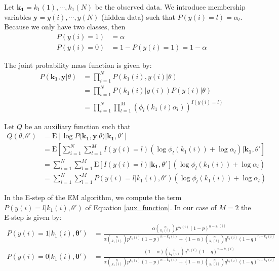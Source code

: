 Let $\mathbf{k_1} = k_1(1), \cdots, k_1(N)$ be the observed data. 
We introduce membership variables $\mathbf{y} = y(i), \cdots, y(N)$ (hidden data) such that $P(y(i) = l) = \alpha_l$. Because we only have two classes, then 
\begin{align*}
P(y(i) = 1) &= \alpha \\
P(y(i) = 0) &= 1-P(y(i) = 1) = 1 - \alpha
\end{align*}

The joint probability mass function is given by:
\begin{align*}
P(\mathbf{k_1}, \mathbf{y} | \theta ) &= \prod_{i=1}^{N} P(k_1(i), y(i) | \theta ) \\
&= \prod_{i=1}^{N} P(k_1(i) | y(i) ) P(y(i) | \theta )  \\
&= \prod_{i=1}^{N} \prod_{l=1}^{M} (\phi_l(k_1(i) \alpha_l)) ^ {I(y(i)=l)}
\end{align*}

Let $Q$ be an auxiliary function such that
\begin{align}
Q(\theta, \theta') &= \mathrm{E} \left[ \log P(\mathbf{k_1}, \mathbf{y} | \theta ) | \mathbf{k_1}, \theta' \right] \nonumber \\
&= \mathrm{E} \left[ \sum_{i=1}^{N} \sum_{l=1}^{M} I(y(i)=l) (\log \phi_l(k_1(i)) + \log \alpha_l) | \mathbf{k_1}, \theta' \right] \nonumber \\
&= \sum_{i=1}^{N} \sum_{l=1}^{M} \mathrm{E} \left[ I(y(i)=l) | \mathbf{k_1}, \theta' \right] (\log \phi_l(k_1(i)) + \log \alpha_l)  \nonumber \\
\label{aux_function}
&= \sum_{i=1}^{N} \sum_{l=1}^{M} P(y(i) = l | k_1(i), \theta') (\log \phi_l(k_1(i)) + \log \alpha_l)
\end{align}

In the E-step of the EM algorithm, we compute the term $P(y(i) = l | k_1(i), \theta')$ of Equation \ref{aux_function}. 
In our case of $M=2$ the E-step is given by:
\begin{align*}
P(y(i) = 1 | k_1(i), \mathbf{\theta'}) &= \frac{\alpha \binom{n}{k_1(i)} p^{k_1(i)} (1-p)^{n-k_1(i)}}{\alpha \binom{n}{k_1(i)} p^{k_1(i)} (1-p)^{n-k_1(i)} + (1-\alpha) \binom{n}{k_1(i)} q^{k_1(i)} (1-q)^{n-k_1(i)}} \\
P(y(i) = 0 | k_1(i), \mathbf{\theta'}) &= \frac{(1-\alpha) \binom{n}{k_1(i)} q^{k_1(i)} (1-q)^{n-k_1(i)}}{\alpha \binom{n}{k_1(i)} p^{k_1(i)} (1-p)^{n-k_1(i)} + (1-\alpha) \binom{n}{k_1(i)} q^{k_1(i)} (1-q)^{n-k_1(i)}}
\end{align*}

